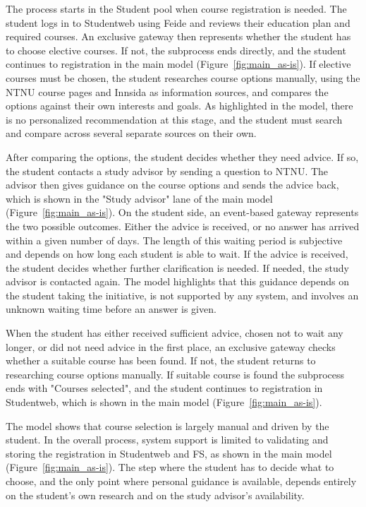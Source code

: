 The process starts in the Student pool when course registration is needed. The student logs in to Studentweb using Feide and reviews their education plan and required courses. An exclusive gateway then represents whether the student has to choose elective courses. If not, the subprocess ends directly, and the student continues to registration in the main model (Figure~\ref{fig:main_as-is}). If elective courses must be chosen, the student researches course options manually, using the NTNU course pages and Innsida as information sources, and compares the options against their own interests and goals. As highlighted in the model, there is no personalized recommendation at this stage, and the student must search and compare across several separate sources on their own.

After comparing the options, the student decides whether they need advice. If so, the student contacts a study advisor by sending a question to NTNU. The advisor then gives guidance on the course options and sends the advice back, which is shown in the "Study advisor" lane of the main model (Figure~\ref{fig:main_as-is}). On the student side, an event-based gateway represents the two possible outcomes. Either the advice is received, or no answer has arrived within a given number of days. The length of this waiting period is subjective and depends on how long each student is able to wait. If the advice is received, the student decides whether further clarification is needed. If needed, the study advisor is contacted again. The model highlights that this guidance depends on the student taking the initiative, is not supported by any system, and involves an unknown waiting time before an answer is given.

When the student has either received sufficient advice, chosen not to wait any longer, or did not need advice in the first place, an exclusive gateway checks whether a suitable course has been found. If not, the student returns to researching course options manually. If suitable course is found the subprocess ends with "Courses selected", and the student continues to registration in Studentweb, which is shown in the main model (Figure~\ref{fig:main_as-is}).

The model shows that course selection is largely manual and driven by the student. In the overall process, system support is limited to validating and storing the registration in Studentweb and FS, as shown in the main model (Figure~\ref{fig:main_as-is}). The step where the student has to decide what to choose, and the only point where personal guidance is available, depends entirely on the student’s own research and on the study advisor’s availability.

